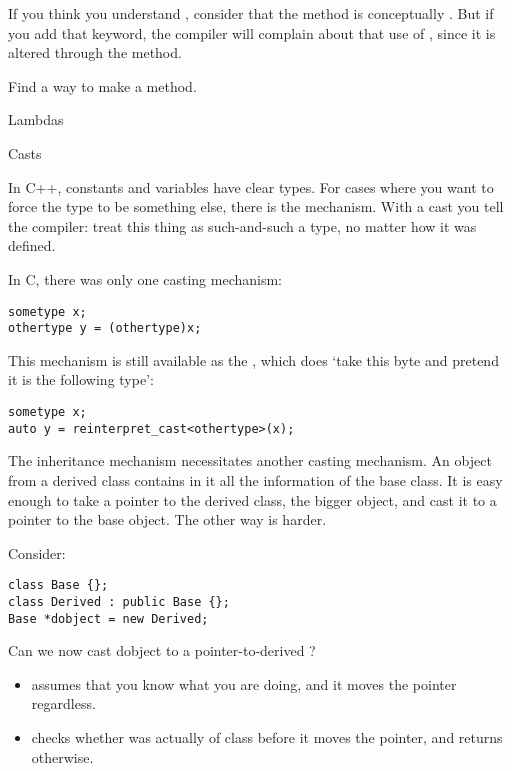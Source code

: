 If you think you understand , consider that the 
method is conceptually . But if you add that keyword, the
compiler will complain about that use of , since it is
altered through the  method.

\begin{exercise}
  \label{ex:rangeconstiter}
  Find a way to make  a  method.
\end{exercise}

 {Lambdas}
\label{sec:lambda}


 {Casts}
\label{sec:cast}

In C++, constants and variables have clear types. For cases where you
want to force the type to be something else, there is the
 mechanism. With a cast you tell the compiler:
treat this thing as such-and-such a type, no matter how it was
defined.

In C, there was only one casting mechanism:
\begin{lstlisting}
sometype x;
othertype y = (othertype)x;
\end{lstlisting}
This mechanism is still available as the
, which does `take this byte and pretend
it is the following type':
\begin{lstlisting}
sometype x;
auto y = reinterpret_cast<othertype>(x);
\end{lstlisting}

The inheritance mechanism necessitates another casting mechanism.
An object from a derived class contains in it all the information of
the base class. It is easy enough to take a pointer to the derived
class, the bigger object, and cast it to a pointer to the base object.
The other way is harder.

Consider:
\begin{lstlisting}
class Base {};
class Derived : public Base {};
Base *dobject = new Derived;
\end{lstlisting}
Can we now cast dobject to a pointer-to-derived ?
\begin{itemize}
\item {} assumes that you know what you are
  doing, and it moves the pointer regardless.
\item {} checks whether  was
  actually of class  before it moves the pointer, and
  returns  otherwise.
\end{itemize}


